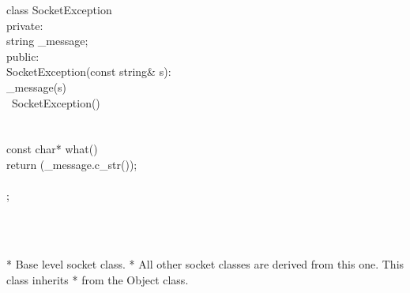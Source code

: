\documentclass{article}
\begin{document}
 class SocketException {
\\
 private:
\\
     string _message;
\\
 public:
\\
     SocketException(const string& s):
\\
         _message(s) { }
\\
     ~SocketException()
\\
     {
\\
     }
\\
     const char* what() {
\\
         return (_message.c_str());
\\
     }
\\
 };
\strut\\\strut\\* Base level socket class.
  * All other socket classes are derived from this one. This class inherits
  * from the Object class.
  \strut\goodbreak
{}\strut\nopagebreak\\
\end{document}
